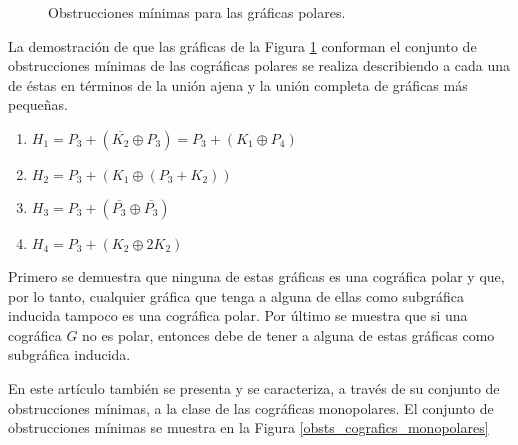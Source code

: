 \begin{figure}[ht!]
\begin{center}
\end{center}
\caption{Obstrucciones mínimas para las gráficas polares.}
\label{obsts_cografics_polares}
\end{figure}

La demostración de que las gráficas de la Figura
\ref{obsts_cografics_polares} conforman el conjunto de
obstrucciones mínimas de las cográficas polares se
realiza describiendo a cada una de éstas en términos
de la unión ajena y la unión completa de gráficas más
pequeñas.

\begin{enumerate}[(1)]
    \item $H_1 = P_3 + ( \overline{K_2} \oplus P_3) = P_3+ (K_1 \oplus P_4)$
    \item $H_2 = P_3 + (K_1 \oplus (P_3 + K_2))$
    \item $H_3 = P_3 + ( \overline{P_3} \oplus \overline{P_3})$
    \item $H_4 = P_3 + (K_2 \oplus 2K_2)$
\end{enumerate}

Primero se demuestra que ninguna de estas gráficas es
una cográfica polar y que, por lo tanto, cualquier
gráfica que tenga a alguna de ellas como subgráfica
inducida tampoco es una cográfica polar. Por último se
muestra que si una cográfica $G$ no es polar, entonces
debe de tener a alguna de estas gráficas como subgráfica
inducida.

En este artículo también se presenta y se caracteriza,
a través de su conjunto de obstrucciones mínimas, a la
clase de las cográficas monopolares. El conjunto de
obstrucciones m\'inimas se muestra en la Figura
\ref{obsts_cografics_monopolares}



